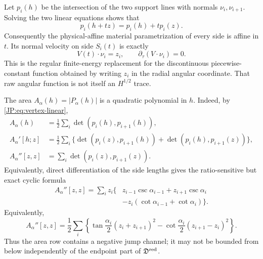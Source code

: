 \documentclass[11pt]{amsart}
\numberwithin{equation}{section}
\theoremstyle{definition}
\theoremstyle{remark}
\newcommand{\Dred}{\mathfrak D^{\rm red}}
\begin{document}
Let $p_i(h)$ be the intersection of the two support lines with normals
$\nu_i,\nu_{i+1}$.  Solving the two linear equations shows that
\begin{equation}\label{JP:eq:vertex-linear}
 p_i(h+tz)=p_i(h)+t p_i(z).
\end{equation}
Consequently the physical-affine material parametrization of every side is
affine in $t$.  Its normal velocity on side $S_i(t)$ is exactly
\begin{equation}\label{JP:eq:constant-normal}
 V(t)\cdot\nu_i=z_i,\qquad \partial_\tau(V\cdot\nu_i)=0.
\end{equation}
This is the regular finite-energy replacement for the discontinuous
piecewise-constant function obtained by writing $z_i$ in the radial angular
coordinate.  That raw angular function is not itself an $H^{1/2}$ trace.

The area $A_\alpha(h)=|P_\alpha(h)|$ is a quadratic polynomial in $h$.
Indeed, by \eqref{JP:eq:vertex-linear},
\begin{equation}\label{JP:eq:area-jets}
\begin{aligned}
 A_\alpha(h)&=\frac12\sum_i\det(p_i(h),p_{i+1}(h)),\\
 A_\alpha'[h;z]
 &=\frac12\sum_i\{\det(p_i(z),p_{i+1}(h))
                 +\det(p_i(h),p_{i+1}(z))\},\\
 A_\alpha''[z,z]&=\sum_i\det(p_i(z),p_{i+1}(z)).
\end{aligned}
\end{equation}
Equivalently, direct differentiation of the side lengths gives the
ratio-sensitive but exact cyclic formula
\begin{equation}\label{JP:eq:area-second-explicit}
\begin{aligned}
 A_\alpha''[z,z]
 =\sum_i z_i\{&z_{i-1}\csc\alpha_{i-1}
               +z_{i+1}\csc\alpha_i\\
              &-z_i(\cot\alpha_{i-1}+\cot\alpha_i)\}.
\end{aligned}
\end{equation}
Equivalently,
\begin{equation}\label{JP:eq:area-jump}
 A_\alpha''[z,z]=\frac12\sum_i\left\{
 \tan\frac{\alpha_i}{2}(z_i+z_{i+1})^2
 -\cot\frac{\alpha_i}{2}(z_{i+1}-z_i)^2\right\}.
\end{equation}
Thus the area row contains a negative jump channel; it may not be bounded
from below independently of the endpoint part of $\Dred$.
\end{document}

